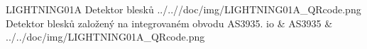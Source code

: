 \uvod
{LIGHTNING01A}
{Detektor blesků}
{}
{../..//doc/img/LIGHTNING01A_QRcode.png}
{Detektor blesků založený na integrovaném obvodu AS3935.}
{			io
		 & AS3935  & \\ \hline  }
{../../doc/img/LIGHTNING01A_QRcode.png}